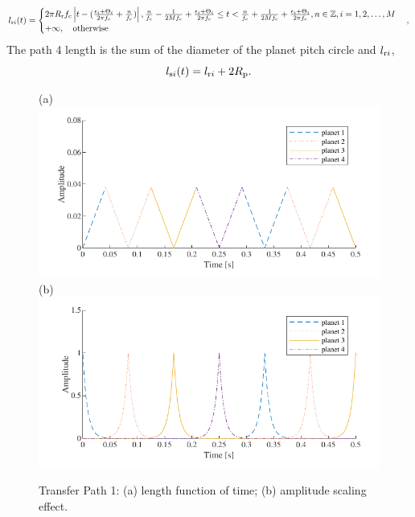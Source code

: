 \documentclass[a4paper,fleqn]{cas-sc}%
\begin{document}
\begin{equation}
    l_{{\rm r}i}(t)=
    \begin{cases}
        2 \pi R_{\rm r} f_{\rm c} \left|t-(\frac{\epsilon_i+\Theta_i}{2 \pi f_{\rm c}} + \frac{n}{f_{\rm c}}) \right|, \frac{n}{f_{\rm c}} - \frac{1}{2 M f_{\rm c}} + \frac{\epsilon_i+\Theta_i}{2\pi  f_{\rm c}} \leq t < \frac{n}{f_{\rm c}} + \frac{1}{2 M f_{\rm c}} + \frac{\epsilon_i+\Theta_i}{2\pi f_{\rm c}}, n\in \mathbb{Z} , i=1,2,\ldots,M\\
        +\infty, \quad \text{otherwise}
    \end{cases},
\end{equation}
The path 4 length is the sum of the diameter of the planet pitch circle and $l_{{\rm r}i}$,
\begin{equation}
    l_{{\rm s}i}(t)=l_{{\rm r}i}+2 R_{\rm p}. \label{eq:path_4_length}
\end{equation}
\begin{figure}[pos=htbp]
    \centering
    (a) \includegraphics[scale=0.7,valign=t]{trangle_wave.pdf}\\
    (b) \includegraphics[scale=0.7,valign=t]{transfer_path_timedomain.pdf}
    \caption{Transfer Path 1: (a) length function of time; (b) amplitude scaling effect.}
    \label{fig:transfer_path_effect}
\end{figure}
\end{document}
